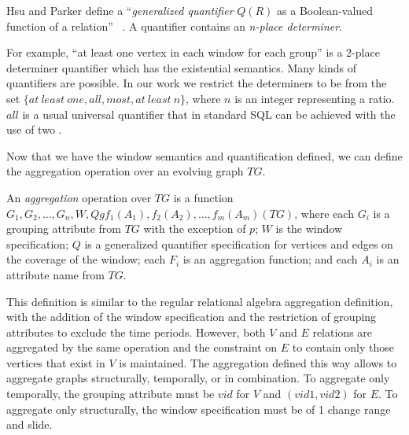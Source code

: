 Hsu and Parker define a ``{\em generalized quantifier} $Q(R)$ as a
Boolean-valued function of a relation'' ~\cite{Hsu1995}.  A quantifier
contains an {\em n-place determiner}.

For example, ``at least one vertex in each window for each group'' is
a 2-place determiner quantifier which has the existential semantics.
Many kinds of quantifiers are possible.  In our work we restrict the
determiners to be from the set $\{at\ least\ one, all, most,
at\ least\ n\}$, where $n$ is an integer representing a ratio.  $all$
is a usual universal quantifier that in standard SQL can be achieved
with the use of two .

Now that we have the window semantics and quantification defined, we
can define the aggregation operation over an evolving graph $TG$.

\begin{definition}
An {\em aggregation} operation over $TG$ is a function \\ $G_1, G_2,
\ldots, G_n, W, Q g f_1(A_1), f_2(A_2), \ldots, f_m(A_m)(TG)$, where
each $G_i$ is a grouping attribute from $TG$ with the exception of
$p$; $W$ is the window specification; $Q$ is a generalized quantifier
specification for vertices and edges on the coverage of the window;
each $F_i$ is an aggregation function; and each $A_i$ is an attribute
name from $TG$.
\label{def:agg}
\end{definition}

This definition is similar to the regular relational algebra
aggregation definition, with the addition of the window specification
and the restriction of grouping attributes to exclude the time
periods.  However, both $V$ and $E$ relations are aggregated by the
same operation and the constraint on $E$ to contain only those
vertices that exist in $V$ is maintained.  The aggregation defined
this way allows to aggregate graphs structurally, temporally, or in
combination.  To aggregate only temporally, the grouping attribute
must be $vid$ for $V$ and $(vid1, vid2)$ for $E$.  To aggregate only
structurally, the window specification must be of 1 change range and
slide.


